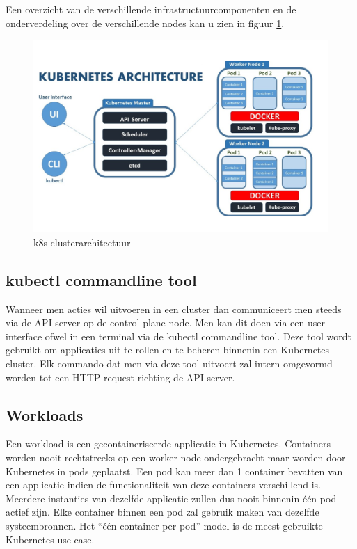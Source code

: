 Een overzicht van de verschillende infrastructuurcomponenten en de onderverdeling over de verschillende nodes kan u zien in figuur \ref{k8s-architectuur}. 

\begin{figure}[h]
    \centering
    \includegraphics[scale=.7]{img/k8s-architecture.png}
    \caption{k8s clusterarchitectuur \autocite{Collabnix2019}}
    \label{k8s-architectuur}
\end{figure}

\subsection{kubectl commandline tool}

Wanneer men acties wil uitvoeren in een cluster dan communiceert men steeds via de API-server op de control-plane node. Men kan dit doen via een user interface ofwel in een terminal via de kubectl commandline tool. Deze tool wordt gebruikt om applicaties uit te rollen en te beheren binnenin een Kubernetes cluster.
Elk commando dat men via deze tool uitvoert zal intern omgevormd worden tot een HTTP-request richting de API-server. \autocite{Biradar2019}
   

\subsection{Workloads}
\label{sec:workloads}

Een workload is een gecontaineriseerde applicatie in Kubernetes. Containers worden nooit rechtstreeks op een worker node ondergebracht maar worden door Kubernetes in pods geplaatst. Een pod kan meer dan 1 container bevatten van een applicatie indien de functionaliteit van deze containers verschillend is. Meerdere instanties van dezelfde applicatie zullen dus nooit binnenin één pod actief zijn. Elke container binnen een pod zal gebruik maken van dezelfde systeembronnen. Het “één-container-per-pod” model is de meest gebruikte Kubernetes use case. \autocite{Kubernetes2022}

